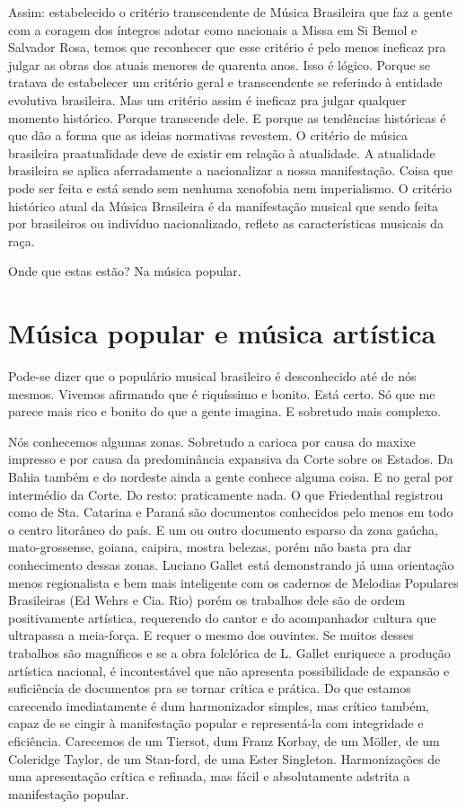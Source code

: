 Assim: estabelecido o critério transcendente de Música Brasileira que
faz a gente com a coragem dos íntegros adotar como nacionais a Missa em
Si Bemol e Salvador Rosa, temos que reconhecer que esse critério é pelo
menos ineficaz pra julgar as obras dos atuais menores de quarenta anos.
Isso é lógico. Porque se tratava de estabelecer um critério geral e
transcendente se referindo à entidade evolutiva brasileira. Mas um
critério assim é ineficaz pra julgar qualquer momento histórico. Porque
transcende dele. E porque as tendências históricas é que dão a forma que
as ideias normativas revestem. O critério de música brasileira
praatualidade deve de existir em relação à atualidade. A atualidade
brasileira se aplica aferradamente a nacionalizar a nossa manifestação.
Coisa que pode ser feita e está sendo sem nenhuma xenofobia nem
imperialismo. O critério histórico atual da Música Brasileira é da
manifestação musical que sendo feita por brasileiros ou indivíduo
nacionalizado, reflete as características musicais da raça.

Onde que estas estão? Na música popular.

\section{Música popular e música artística}

Pode-se dizer que o populário musical brasileiro é desconhecido até de
nós mesmos. Vivemos afirmando que é riquíssimo e bonito. Está certo. Só
que me parece mais rico e bonito do que a gente imagina. E sobretudo
mais complexo.

Nós conhecemos algumas zonas. Sobretudo a carioca por causa do maxixe
impresso e por causa da predominância expansiva da Corte sobre os
Estados. Da Bahia também e do nordeste ainda a gente conhece alguma
coisa. E no geral por intermédio da Corte. Do resto: praticamente nada.
O que Friedenthal registrou como de Sta. Catarina e Paraná são
documentos conhecidos pelo menos em todo o centro litorâneo do país. E
um ou outro documento esparso da zona gaúcha, mato-grossense, goiana,
caipira, mostra belezas, porém não basta pra dar conhecimento dessas
zonas. Luciano Gallet está demonstrando já uma orientação menos
regionalista e bem mais inteligente com os cadernos de Melodias
Populares Brasileiras (Ed Wehrs e Cia. Rio) porém os trabalhos dele são
de ordem positivamente artística, requerendo do cantor e do acompanhador
cultura que ultrapassa a meia-força. E requer o mesmo dos ouvintes. Se
muitos desses trabalhos são magníficos e se a obra folclórica de L.
Gallet enriquece a produção artística nacional, é incontestável que não
apresenta possibilidade de expansão e suficiência de documentos pra se
tornar crítica e prática. Do que estamos carecendo imediatamente é dum
harmonizador simples, mas crítico também, capaz de se cingir à
manifestação popular e representá-la com integridade e eficiência.
Carecemos de um Tiersot, dum Franz Korbay, de um Möller, de um Coleridge
Taylor, de um Stan-ford, de uma Ester Singleton. Harmonizações de uma
apresentação crítica e refinada, mas fácil e absolutamente adstrita a
manifestação popular.

